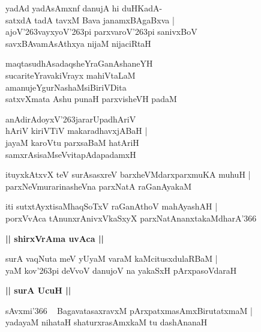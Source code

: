 \documentclass[twoside,12pt,openright]{book}
\def\S{\char'263}
\newcounter{shloka}[chapter]
\def\uvaca#1{\centerline{{\large\textbf{#1}}}}
\begin{document}
\begin{shloka}%
yadAd yadAsAmxnf danujA hi duHKadA-\\
satxdA tadA tavxM Bava janamxBAgaBxva |\\
ajoV\S vayxyoV\S pi parxvaroV\S pi sanivxBoV \\
savxBAvamAsAthxya nijaM nijaciRtaH
\end{shloka}

\begin{shloka}%
maqtasudhAsadaqsheYraGanAshaneYH \\
sucariteYravakiVrayx mahiVtaLaM \\
amanujeYgurNashaMsiBiriVDita\\
satxvXmata Ashu punaH parxvisheVH padaM
\end{shloka}

\begin{shloka}%
anAdirAdoyxV\S jararUpadhAriV \\
hAriV kiriVTiV makaradhavxjABaH |\\
jayaM karoVtu parxsaBaM hatAriH\\
samxrAsisaMseVvitapAdapadamxH
\end{shloka}

\begin{shloka}%
ituyxkAtxvX teV surAsasxreV barxheVMdarxparxmuKA muhuH |\\
parxNeVmurarinasheVna parxNatA raGanAyakaM 
\end{shloka}

\begin{shloka}%
iti sutxtAyxtisaMhaqSoTxV raGanAthoV mahAyashAH |\\
porxVvAca tAnunxrAnivxVkaSxyX parxNatAnanxtakaMdharA\char'366
\end{shloka}

\uvaca{|| shirxVrAma uvAca ||}

\begin{shloka}%
surA vaqNuta meV yUyaM varaM kaMcitusxdulaRBaM |\\
yaM kov\S pi deVvoV danujoV na yakaSxH pArxpasoVdaraH 
\end{shloka}

\uvaca{|| surA UcuH ||}

\begin{shloka}%
sAvxmi\char'366 ~ BagavatasaxravxM pArxpatxmasAmxBirutatxmaM |\\
yadayaM nihataH shaturxrasAmxkaM tu dashAnanaH 
\end{shloka}
\end{document}

